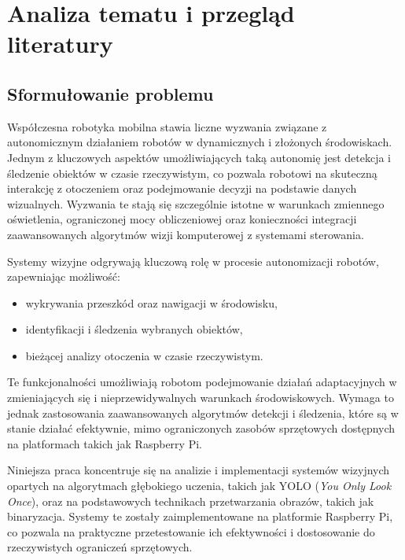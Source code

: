 \documentclass[a4paper,twoside,12pt]{book}
\begin{document}
\chapter{Analiza tematu i przegląd literatury}

\label{ch:analiza}

\section{Sformułowanie problemu}
Współczesna robotyka mobilna stawia liczne wyzwania związane z autonomicznym działaniem robotów w dynamicznych i złożonych środowiskach. Jednym z kluczowych aspektów umożliwiających taką autonomię jest detekcja i śledzenie obiektów w czasie rzeczywistym, co pozwala robotowi na skuteczną interakcję z otoczeniem oraz podejmowanie decyzji na podstawie danych wizualnych. Wyzwania te stają się szczególnie istotne w warunkach zmiennego oświetlenia, ograniczonej mocy obliczeniowej oraz konieczności integracji zaawansowanych algorytmów wizji komputerowej z systemami sterowania.

Systemy wizyjne odgrywają kluczową rolę w procesie autonomizacji robotów, zapewniając możliwość:
\begin{itemize}
    \item wykrywania przeszkód oraz nawigacji w środowisku,
    \item identyfikacji i śledzenia wybranych obiektów,
    \item bieżącej analizy otoczenia w czasie rzeczywistym.
\end{itemize}

Te funkcjonalności umożliwiają robotom podejmowanie działań adaptacyjnych w zmieniających się i nieprzewidywalnych warunkach środowiskowych. Wymaga to jednak zastosowania zaawansowanych algorytmów detekcji i śledzenia, które są w stanie działać efektywnie, mimo ograniczonych zasobów sprzętowych dostępnych na platformach takich jak Raspberry Pi.

Niniejsza praca koncentruje się na analizie i implementacji systemów wizyjnych opartych na algorytmach głębokiego uczenia, takich jak YOLO (\textit{You Only Look Once}), oraz na podstawowych technikach przetwarzania obrazów, takich jak binaryzacja. Systemy te zostały zaimplementowane na platformie Raspberry Pi, co pozwala na praktyczne przetestowanie ich efektywności i dostosowanie do rzeczywistych ograniczeń sprzętowych.

\newpage
\end{document}
